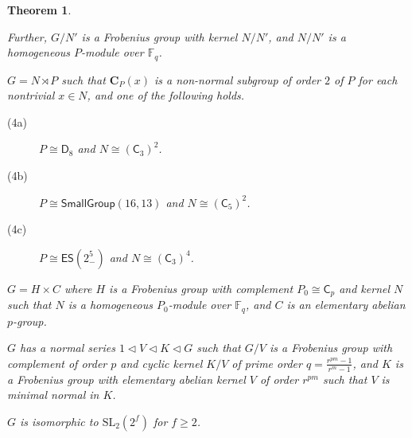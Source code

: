 \documentclass[9pt]{article}
\newtheorem{mainthm}{Theorem}
\begin{document}
\begin{mainthm}
\begin{description}
	  Further, $G/N'$ is a Frobenius group with kernel $N/N'$, 
	  and
	  $N/N'$ is a homogeneous $P$-module over $\mathbb{F}_q$. 
	  \item[(4)] $G=N \rtimes P$ such that $\mathbf{C}_{P}(x)$ is a non-normal subgroup of order $2$ of $P$ for each nontrivial $x \in N$, and one of the following holds.
	  \begin{description}
		 \item[(4a)] $P\cong \mathsf{D}_{8}$ and $N\cong (\mathsf{C}_{3})^{2}$.
		 \item[(4b)] $P\cong \mathsf{SmallGroup}(16,13)$ and $N\cong (\mathsf{C}_{5})^{2}$. 
		 \item[(4c)] $P\cong \mathsf{ES}(2^{5}_{-})$ and $N\cong (\mathsf{C}_{3})^{4}$.
	  \end{description}
	  \item[(5)] $G=H\times C$ 
	  where $H$ is a Frobenius group with complement $P_0\cong \mathsf{C}_{p}$ and kernel $N$
	  such that $N$ is a homogeneous $P_0$-module over $\mathbb{F}_q$,
	  and $C$ is an elementary abelian $p$-group.
	  \item[(6)] $G$ has a normal series $1\lhd V\lhd K\lhd G$ such that $G/V$ is a Frobenius group with complement of order $p$ and cyclic kernel $K/V$
	of prime order $q=\frac{r^{pm}-1}{r^m-1}$,
	and $K$ is a Frobenius group with elementary abelian kernel $V$ of order $r^{pm}$ such that $V$ is minimal normal in $K$.
	  \item[(7)] $G$ is isomorphic to $\mathrm{SL}_2(2^{f})$ for $f\geq 2$.
   \end{description}
\end{mainthm}
\end{document}

